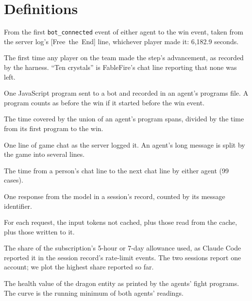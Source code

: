 \documentclass[11pt,a4paper]{article}
\newcommand{\adv}[1]{\mbox{\textsf{[#1]}}}
\begin{document}



\appendix
\section{Definitions}
\label{app:defs}

\begin{description}[leftmargin=0pt,itemsep=3pt,font=\normalfont\bfseries]
  \item[Official clock.] From the first \texttt{bot\_connected} event of either agent to the win event, taken from the server log's \adv{Free the End} line, whichever player made it: 6,182.9 seconds.
  \item[Step.] The first time any player on the team made the step's advancement, as recorded by the harness. ``Ten crystals'' is FableFire's chat line reporting that none was left.
  \item[Program.] One JavaScript program sent to a bot and recorded in an agent's programs file. A program counts as before the win if it started before the win event.
  \item[Running share.] The time covered by the union of an agent's program spans, divided by the time from its first program to the win.
  \item[Chat line.] One line of game chat as the server logged it. An agent's long message is split by the game into several lines.
  \item[Wait for an agent.] The time from a person's chat line to the next chat line by either agent (99 cases).
  \item[Model request.] One response from the model in a session's record, counted by its message identifier.
  \item[Context size.] For each request, the input tokens not cached, plus those read from the cache, plus those written to it.
  \item[Usage window.] The share of the subscription's 5-hour or 7-day allowance used, as Claude Code reported it in the session record's rate-limit events. The two sessions report one account; we plot the highest share reported so far.
  \item[Dragon's health.] The health value of the dragon entity as printed by the agents' fight programs. The curve is the running minimum of both agents' readings.
\end{description}
\end{document}
